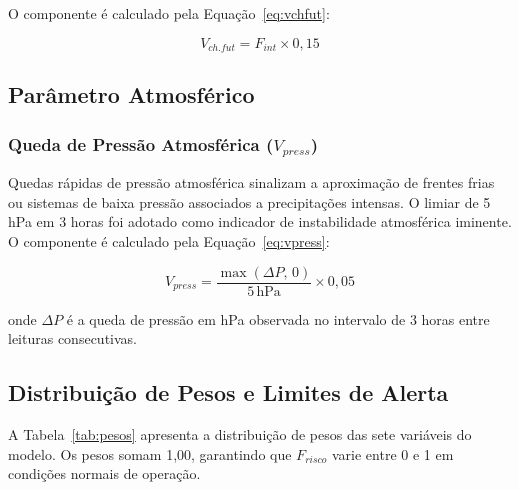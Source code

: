 O componente é calculado pela Equação~\ref{eq:vchfut}:

\begin{equation}
\label{eq:vchfut}
V_{ch.fut} = F_{int} \times 0{,}15
\end{equation}

\subsection{Parâmetro Atmosférico}
\label{subsec:atmosferico}

\subsubsection{Queda de Pressão Atmosférica (\texorpdfstring{$V_{press}$}{V\_press})}

Quedas rápidas de pressão atmosférica sinalizam a aproximação de
frentes frias ou sistemas de baixa pressão associados a
precipitações intensas. O limiar de 5\,hPa em 3 horas foi adotado
como indicador de instabilidade atmosférica iminente. O componente
é calculado pela Equação~\ref{eq:vpress}:

\begin{equation}
\label{eq:vpress}
V_{press} = \frac{\max(\Delta P,\,0)}{5\,\text{hPa}} \times 0{,}05
\end{equation}

\noindent onde $\Delta P$ é a queda de pressão em hPa observada no
intervalo de 3 horas entre leituras consecutivas.

\subsection{Distribuição de Pesos e Limites de Alerta}
\label{subsec:pesos-limites}

A Tabela~\ref{tab:pesos} apresenta a distribuição de pesos das sete
variáveis do modelo. Os pesos somam 1,00, garantindo que $F_{risco}$
varie entre 0 e 1 em condições normais de operação.

